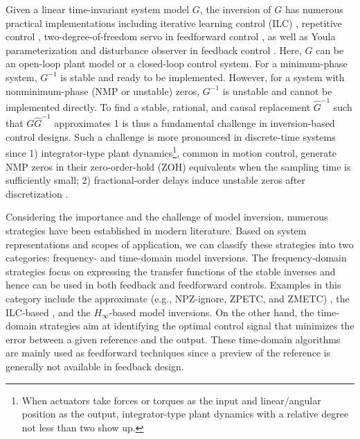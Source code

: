 \documentclass [11pt, proquest] {uwthesis}[2020/02/24]
\begin{document}
Given a linear time-invariant system model $G$, the inversion of
$G$ has numerous practical implementations including iterative learning
control (ILC) \cite{Bristow2006,shen2018iterative,de2019data}, repetitive
control \cite{wang2018multirate,zhu2017observer}, two-degree-of-freedom
servo in feedforward control \cite{Tomizuka1999,wang2016robust},
as well as Youla parameterization and disturbance observer in feedback
control \cite{jiang2019local,Ohnishi1993,chen2011minimum,apte2019disturbance,wang2017tutorial}.
Here, $G$ can be an open-loop plant model or a closed-loop control
system. For a minimum-phase system, $G^{-1}$ is stable and ready
to be implemented. However, for a system with nonminimum-phase (NMP
or unstable) zeros, $G^{-1}$ is unstable and cannot be implemented
directly. To find a stable, rational, and causal replacement $\hat{G}^{-1}$
such that $G\hat{G}^{-1}$ approximates 1 is thus a fundamental challenge
in inversion-based control designs. Such a challenge is more pronounced
in discrete-time systems since 1) integrator-type plant dynamics\footnote{When actuators take forces or torques as the input and linear/angular
position as the output, integrator-type plant dynamics with a relative
degree not less than two show up.}, common in motion control, generate NMP zeros in their zero-order-hold
(ZOH) equivalents when the sampling time is sufficiently small; 2)
fractional-order delays induce unstable zeros after discretization
\cite{Astrom1984_zerosOfSampledSys}.

Considering the importance and the challenge of model inversion,
numerous strategies have been established in modern literature. Based
on system representations and scopes of application, we can classify
these strategies into two categories: frequency- and time-domain model
inversions. The frequency-domain strategies focus on expressing the
transfer functions of the stable inverses and hence can be used in
both feedback and feedforward controls. Examples in this category
include the approximate (e.g., NPZ-ignore, ZPETC, and ZMETC) \cite{Tomizuka1987,dai2019quantitative,butterworth_analysis_2012,Butterworth2008},
the ILC-based \cite{devasia2017iterative,kim_modelingfree_2013,chen2016data},
and the $H_{\infty}$-based \cite{zheng2018systematic,francis_h_1984,zheng2017design}
model inversions. On the other hand, the time-domain strategies \cite{de2019finite,dewey1998experimental,Ramani:2017hx,van2018inversion}
aim at identifying the optimal control signal that minimizes the error
between a given reference and the output. These time-domain algorithms
are mainly used as feedforward techniques since a preview of the reference
is generally not available in feedback design.
\end{document}
